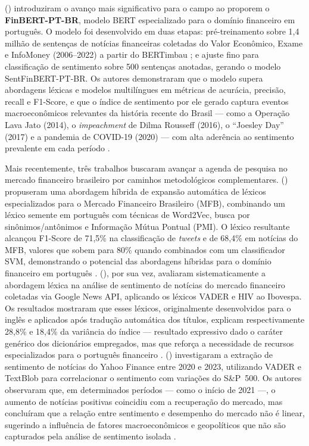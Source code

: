 \citeauthor{santos2023finbert} (\citeyear{santos2023finbert}) introduziram o avanço mais significativo para o campo ao proporem o \textbf{FinBERT-PT-BR}, modelo BERT especializado para o domínio financeiro em português. O modelo foi desenvolvido em duas etapas: pré-treinamento sobre 1,4 milhão de sentenças de notícias financeiras coletadas do Valor Econômico, Exame e InfoMoney (2006--2022) a partir do BERTimbau \cite{souza2020}; e ajuste fino para classificação de sentimento sobre 500 sentenças anotadas, gerando o modelo SentFinBERT-PT-BR. Os autores demonstraram que o modelo supera abordagens léxicas e modelos multilíngues em métricas de acurácia, precisão, recall e F1-Score, e que o índice de sentimento por ele gerado captura eventos macroeconômicos relevantes da história recente do Brasil --- como a Operação Lava Jato (2014), o \textit{impeachment} de
Dilma Rousseff (2016), o ``Joesley Day'' (2017) e a pandemia de COVID-19 (2020) --- com alta aderência ao sentimento prevalente em cada período \cite{santos2023finbert}.

Mais recentemente, três trabalhos buscaram avançar a agenda de pesquisa no mercado financeiro brasileiro por caminhos metodológicos complementares. \citeauthor{sousa2025} (\citeyear{sousa2025}) propuseram uma abordagem híbrida de expansão automática de léxicos especializados para o Mercado Financeiro Brasileiro (MFB), combinando um léxico semente em português com técnicas de Word2Vec, busca por sinônimos/antônimos e Informação Mútua Pontual (PMI). O léxico resultante alcançou F1-Score de 71,5\% na classificação de \textit{tweets} e de 68,4\% em notícias do MFB, valores que sobem para 80\% quando combinados com um classificador SVM, demonstrando o potencial das abordagens híbridas para o domínio financeiro em português \cite{sousa2025}. \citeauthor{lucas2025} (\citeyear{lucas2025}), por sua vez, avaliaram sistematicamente a abordagem
léxica na análise de sentimento de notícias do mercado financeiro coletadas via Google News API, aplicando os léxicos VADER e HIV ao Ibovespa. Os resultados mostraram que esses léxicos, originalmente desenvolvidos para o inglês e aplicados após tradução automática dos títulos, explicam respectivamente 28,8\% e 18,4\% da variância do índice --- resultado expressivo dado o caráter genérico dos dicionários empregados, mas que reforça a necessidade de recursos especializados para o português financeiro \cite{lucas2025}. \citeauthor{silva2025} (\citeyear{silva2025}) investigaram a extração de sentimento de notícias do Yahoo Finance entre 2020 e 2023, utilizando VADER e TextBlob para correlacionar o
sentimento com variações do S\&P~500. Os autores observaram que, em determinados períodos --- como o início de 2021 ---, o aumento de notícias positivas coincidiu com a recuperação do mercado, mas concluíram que a relação entre sentimento e desempenho do mercado não é linear, sugerindo a influência de fatores macroeconômicos e geopolíticos que não são capturados pela análise de sentimento isolada \cite{silva2025}.

